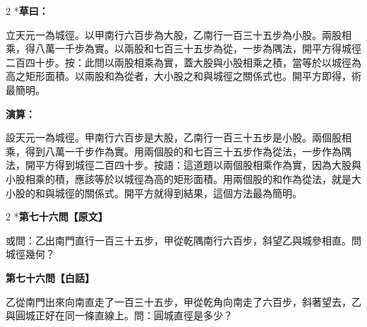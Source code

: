 \documentclass[11pt,a4paper]{article}
\begin{document}
\begin{paracol}{2}
\switchcolumn[0]*\textbf{草曰：}

\small 立天元一為城徑。以甲南行六百步為大股，乙南行一百三十五步為小股。兩股相乘，得八萬一千步為實。以兩股和七百三十五步為從，一步為隅法，開平方得城徑二百四十步。按：此問以兩股相乘為實，蓋大股與小股相乘之積，當等於以城徑為高之矩形面積。以兩股和為從者，大小股之和與城徑之關係式也。開平方即得，術最簡明。

\switchcolumn\textbf{演算：}

\small 設天元一為城徑。甲南行六百步是大股，乙南行一百三十五步是小股。兩個股相乘，得到八萬一千步作為實。用兩個股的和七百三十五步作為從法，一步作為隅法，開平方得到城徑二百四十步。按語：這道題以兩個股相乘作為實，因為大股與小股相乘的積，應該等於以城徑為高的矩形面積。用兩個股的和作為從法，就是大小股的和與城徑的關係式。開平方就得到結果，這個方法最為簡明。
\end{paracol}

\vspace{0.1cm}
\noindent{}
\par\vspace{0.3cm}

\begin{paracol}{2}
\switchcolumn[0]*\noindent\textbf{第七十六問【原文】}

\small 或問：乙出南門直行一百三十五步，甲從乾隅南行六百步，斜望乙與城參相直。問城徑幾何？

\switchcolumn\noindent\textbf{第七十六問【白話】}

\small 乙從南門出來向南直走了一百三十五步，甲從乾角向南走了六百步，斜著望去，乙與圓城正好在同一條直線上。問：圓城直徑是多少？
\end{paracol}

\vspace{0.1cm}
\noindent{}
\par\vspace{0.15cm}
\end{document}
